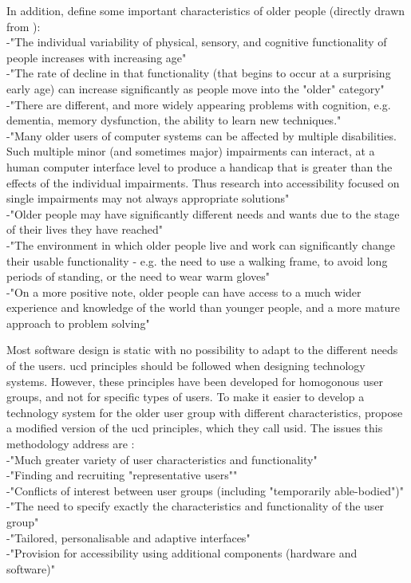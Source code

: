 In addition, \cite{gregor} define some important characteristics of older people (directly drawn from \cite{gregor}):\\
-"The individual variability of physical, sensory, and cognitive functionality of people increases with increasing age"\\
-"The rate of decline in that functionality (that begins to occur at a surprising early age) can increase significantly as people move into the "older" category"\\
-"There are different, and more widely appearing problems with cognition, e.g. dementia, memory dysfunction, the ability to learn new techniques."\\
-"Many older users of computer systems can be affected by multiple disabilities. Such multiple minor (and sometimes major) impairments can interact, at a human computer interface level to produce a handicap that is greater than the effects of the individual impairments. Thus research into accessibility focused on single impairments may not always appropriate solutions"\\
-"Older people may have significantly different needs and wants due to the stage of their lives they have reached"\\
-"The environment in which older people live and work can significantly change their usable functionality - e.g. the need to use a walking frame, to avoid long periods of standing, or the need to wear warm gloves"\\
-"On a more positive note, older people can have access to a much wider experience and knowledge of the world than younger people, and a more mature approach to problem solving"

Most software design is static with no possibility to adapt to the different needs of the users. \ac{ucd} principles should be followed when designing technology systems. However, these principles have been developed for homogonous user groups, and not for specific types of users. To make it easier to develop a technology system for the older user group with different characteristics, \cite{gregor} propose a modified version of the \ac{ucd} principles, which they call \ac{usid}. The issues this methodology address are \cite{gregor}: \\
-"Much greater variety of user characteristics and functionality" \\
-"Finding and recruiting "representative users"" \\
-"Conflicts of interest between user groups (including "temporarily able-bodied")" \\
-"The need to specify exactly the characteristics and functionality of the user group" \\
-"Tailored, personalisable and adaptive interfaces" \\
-"Provision for accessibility using additional components (hardware and software)"

